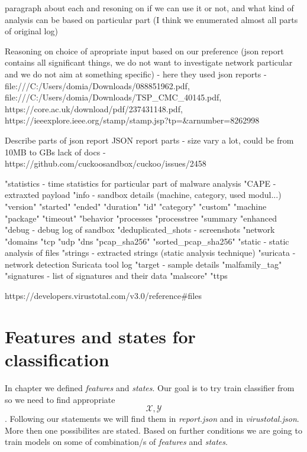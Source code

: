 paragraph about each and resoning on if we can use it or not, and what kind of analysis can be based on particular part (I think we enumerated almost all parts of original log)


Reasoning on choice of apropriate input based on our preference (json report contains all significant things, we do not want to investigate network particular and we do not aim at something specific)
- here they used json reports - file:///C:/Users/domia/Downloads/088851962.pdf, file:///C:/Users/domia/Downloads/TSP_CMC_40145.pdf, https://core.ac.uk/download/pdf/237431148.pdf, https://ieeexplore.ieee.org/stamp/stamp.jsp?tp=&arnumber=8262998

Describe parts of json report
JSON report parts  
- size vary a lot, could be from 10MB to GBs
lack of docs - https://github.com/cuckoosandbox/cuckoo/issues/2458

"statistics - time statistics for particular part of malware analysis
"CAPE - extraxted payload
"info - sandbox details (machine, category, used modul...)
    "version"
    "started"
    "ended"
    "duration"
    "id"
    "category"
    "custom"
    "machine
    "package"
    "timeout"
"behavior
    "processes
    "processtree
    "summary
    "enhanced
"debug - debug log of sandbox
"deduplicated_shots - screenshots
"network
    "domains
    "tcp
    "udp
    "dns
    "pcap_sha256"
    "sorted_pcap_sha256"
"static - static analysis of files
"strings - extracted strings (static analysis technique)
"suricata - network detection Suricata tool log
"target - sample details
"malfamily_tag"
"signatures - list of signatures and their data
"malscore"
"ttps

https://developers.virustotal.com/v3.0/reference#files


\section{Features and states for classification}
In chapter  we defined \emph{features} and \emph{states}. Our goal  is to try train classifier from so we need to find appropriate $$\mathcal{X}, \mathcal{Y}$$. Following our statements we will find them in \emph{report.json} and in \emph{virustotal.json}. More then one possibilites are stated. Based on further conditions we are going to train models on some of combination/s of \emph{features} and \emph{states}.

